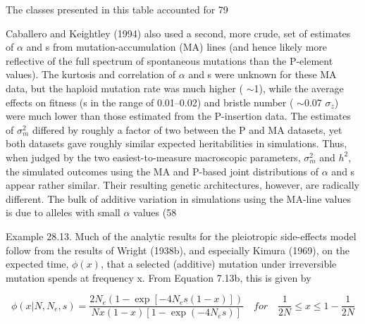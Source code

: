 \documentclass{article}
\begin{document}
The classes presented in this table accounted for 79%

Caballero and Keightley (1994) also used a second, more crude, set of estimates of  $ \alpha $ and s from mutation-accumulation (MA) lines (and hence likely more reflective of the full spectrum of spontaneous mutations than the P-element values). The kurtosis and correlation of  $ \alpha $ and s were unknown for these MA data, but the haploid mutation rate was much higher ( $ \sim $1), while the average effects on fitness (s in the range of 0.01–0.02) and bristle number ( $ \sim $0.07 $ \sigma_{z} $) were much lower than those estimated from the P-insertion data. The estimates of  $ \sigma_{m}^{2} $ differed by roughly a factor of two between the P and MA datasets, yet both datasets gave roughly similar expected heritabilities in simulations. Thus, when judged by the two easiest-to-measure macroscopic parameters,  $ \sigma_{m}^{2} $ and  $ h^{2} $, the simulated outcomes using the MA and P-based joint distributions of  $ \alpha $ and s appear rather similar. Their resulting genetic architectures, however, are radically different. The bulk of additive variation in simulations using the MA-line values is due to alleles with small  $ \alpha $ values (58%

Example 28.13. Much of the analytic results for the pleiotropic side-effects model follow from the results of Wright (1938b), and especially Kimura (1969), on the expected time,  $ \phi(x) $, that a selected (additive) mutation under irreversible mutation spends at frequency x. From Equation 7.13b, this is given by

\begin{equation}
\phi(x|N,N_{e},s)=\frac{2N_{e}(1-\exp[-4N_{e}s(1-x)])}{Nx(1-x)[1-\exp(-4N_{e}s)]}\quad for\quad\frac{1}{2N}\leq x\leq1-\frac{1}{2N}
\end{equation}
\end{document}
